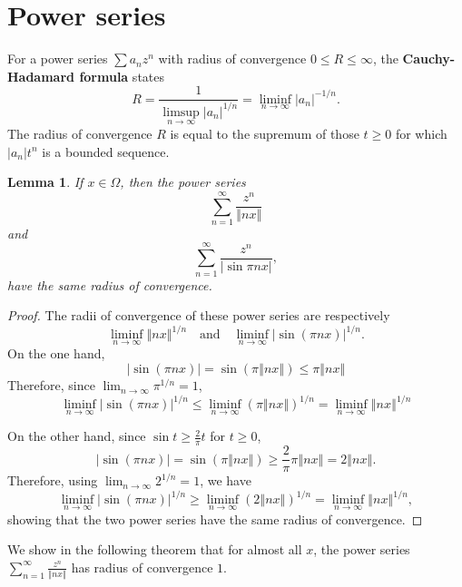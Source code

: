 \documentclass{article}
\newcommand{\norm}[1]{\left\Vert #1 \right\Vert}
\newtheorem{lemma}[theorem]{Lemma}
\begin{document}
\section{Power series}
\label{powersection}
For a power series $\sum a_n z^n$ with radius of convergence $0 \leq R \leq \infty$, the \textbf{Cauchy-Hadamard formula} \cite[p.~111,
Chapter 4, \S 1]{remmert}
states
\begin{equation}
R =\frac{1}{\limsup_{n \to \infty} |a_n|^{1/n}} =  \liminf_{n \to \infty} |a_n|^{-1/n}.
\label{cauchyhadamard}
\end{equation}
The radius of convergence $R$ is equal to the supremum of those $t \geq 0$ for which 
 $|a_n| t^n$ is a bounded sequence.
 

\begin{lemma}
If $x \in \Omega$, then
the power series
\[
\sum_{n=1}^\infty \frac{z^n}{\norm{nx}}
\]
and 
\[
\sum_{n=1}^\infty \frac{z^n}{|\sin \pi n x|},
\]
have the same radius of convergence.
\label{sameradius}
\end{lemma}
\begin{proof}
The radii of convergence of these power series are respectively
\[
\liminf_{n \to \infty} \norm{nx}^{1/n} \quad \textrm{and} \quad  \liminf_{n \to \infty} |\sin(\pi n x)|^{1/n}.
\]
On the one hand, 
\[
|\sin(\pi nx)|=\sin(\pi \norm{nx}) \leq \pi \norm{nx}
\]
Therefore, since $\lim_{n \to \infty} \pi^{1/n}=1$,
\[
\liminf_{n \to \infty} |\sin(\pi nx)|^{1/n} \leq \liminf_{n\to \infty} \left(\pi\norm{nx}\right)^{1/n}
=\liminf_{n \to \infty} \norm{nx}^{1/n}
\]

On the other hand, since $\sin t \geq \frac{2}{\pi}t$ for $t \geq 0$,
\[
|\sin(\pi n x)|=\sin(\pi\norm{nx}) \geq \frac{2}{\pi} \pi\norm{nx}=2\norm{nx}.
\]
Therefore, using $\lim_{n \to \infty} 2^{1/n}=1$, we have
\[
\liminf_{n \to \infty} |\sin(\pi n x)|^{1/n} \geq \liminf_{n \to \infty} \left(2\norm{nx}\right)^{1/n}
=\liminf_{n \to \infty} \norm{nx}^{1/n},
\]
showing that the two power series have the same radius of convergence.
\end{proof}

We  show in the following theorem that for almost all $x$, the power series $\sum_{n=1}^\infty \frac{z^n}{\norm{nx}}$ has radius of convergence $1$.
\end{document}
